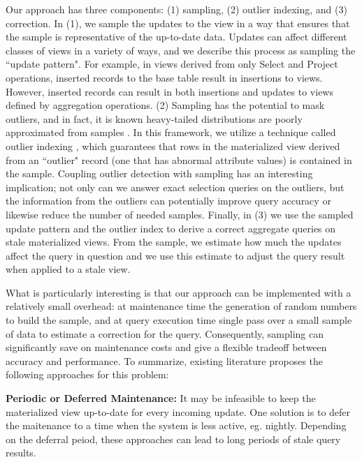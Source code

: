Our approach has three components: (1) sampling, (2) outlier indexing, and (3) correction. In (1), we sample the updates to the view in a way that ensures that the sample is representative of the up-to-date data. Updates can affect different classes of views in a variety of ways, and we describe this process as sampling the ``update pattern". For example, in views derived from only Select and Project operations, inserted records to the base table result in insertions to views. However, inserted records can result in both insertions and updates to views defined by aggregation operations. (2) Sampling has the potential to mask outliers, and in fact, it is known
heavy-tailed distributions are poorly approximated from samples \cite{chaudhuri2001overcoming}.
In this framework, we utilize a technique called outlier indexing \cite{chaudhuri2001overcoming}, which guarantees that rows in the materialized view derived from an ``outlier" record (one that has abnormal attribute values) is contained in the sample.
Coupling outlier detection with sampling has an interesting implication; not only can we answer exact selection queries on the outliers, but
the information from the outliers can potentially improve query accuracy or likewise reduce the number of needed samples.
Finally, in (3) we use the sampled update pattern and the outlier index to derive a correct aggregate queries on stale materialized views.
From the sample, we estimate how much the updates affect the query in question and we use this estimate to adjust the query result when applied to a stale view.

What is particularly interesting is that our approach can be implemented with a relatively small overhead: at maintenance time the generation of random numbers to build the sample, and at query execution time single pass over a small sample of data to estimate a correction for the query.
Consequently, sampling can significantly save on maintenance costs and give a flexible tradeoff between accuracy and performance.
To summarize, existing literature proposes the following approaches for this problem: 
\vspace{1em}

\noindent\textbf{Periodic or Deferred Maintenance: }
It may be infeasible to keep the materialized view up-to-date for every incoming update.
One solution is to defer the maitenance to a time when the system is less active, eg. nightly.
Depending on the deferral peiod, these approaches can lead to long periods of stale query results.

\vspace{1em}

